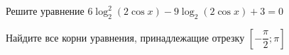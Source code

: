 \begin{ex}
	\begin{condition}
		\begin{enumcols}[label=\asbuk*)]
			\item Решите уравнение \( 6\log_2^2 (2\cos x) - 9\log_2 (2\cos x) + 3 = 0 \)
			\item Найдите все корни уравнения, принадлежащие отрезку \( \left[-\dfrac{\pi}{2};\pi\right] \)
		\end{enumcols}
	\end{condition}
\end{ex}